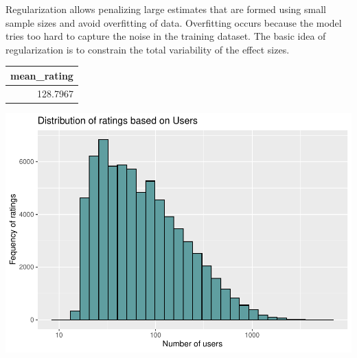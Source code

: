 \documentclass[]{article}
\newenvironment{Shaded}{\begin{snugshade}}{\end{snugshade}}
\newcommand{\CommentTok}[1]{\textcolor[rgb]{0.56,0.35,0.01}{\textit{#1}}}
\newcommand{\DataTypeTok}[1]{\textcolor[rgb]{0.13,0.29,0.53}{#1}}
\newcommand{\DecValTok}[1]{\textcolor[rgb]{0.00,0.00,0.81}{#1}}
\newcommand{\KeywordTok}[1]{\textcolor[rgb]{0.13,0.29,0.53}{\textbf{#1}}}
\newcommand{\NormalTok}[1]{#1}
\newcommand{\OperatorTok}[1]{\textcolor[rgb]{0.81,0.36,0.00}{\textbf{#1}}}
\newcommand{\StringTok}[1]{\textcolor[rgb]{0.31,0.60,0.02}{#1}}
\begin{document}
Regularization allows penalizing large estimates that are formed using
small sample sizes and avoid overfitting of data. Overfitting occurs
because the model tries too hard to capture the noise in the training
dataset. The basic idea of regularization is to constrain the total
variability of the effect sizes.

\begin{Shaded}
\end{Shaded}

\begin{longtable}[]{@{}r@{}}
\toprule
mean\_rating\tabularnewline
\midrule
\endhead
128.7967\tabularnewline
\bottomrule
\end{longtable}

\begin{Shaded}
\end{Shaded}

\includegraphics{Project_MovieLens_files/figure-latex/unnamed-chunk-9-1.pdf}
\end{document}
